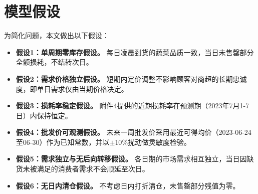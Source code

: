 \section{模型假设}

为简化问题，本文做出以下假设：

\begin{itemize}[itemindent=2em]
  \item \textbf{假设1：单周期零库存假设。} 每日凌晨到货的蔬菜品质一致，当日未售罄部分全额损耗，不结转次日。
  \item \textbf{假设2：需求价格独立假设。} 短期内定价调整不影响顾客对商超的长期忠诚度，即单日需求仅由当期价格决定。
  \item \textbf{假设3：损耗率稳定假设。} 附件4提供的近期损耗率在预测期（2023年7月1-7日）内保持恒定。
  \item \textbf{假设4：批发价可观测假设。} 未来一周批发价采用最近可得均价（2023-06-24至06-30）作为已知常数，并以$\pm10\%$扰动做灵敏度检验。
  \item \textbf{假设5：需求独立与无后向转移假设。} 各日期的市场需求相互独立，当日因缺货未被满足的消费者需求不会顺延至次日。
  \item \textbf{假设6：无日内清仓假设。} 不考虑日内打折清仓，未售罄部分残值为零。
\end{itemize}

